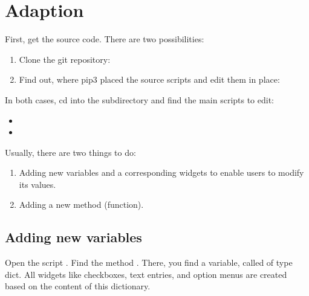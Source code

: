 \documentclass[letterpaper,10pt,english]{sphinxmanual}
\begin{document}
\section{Adaption}
\label{\detokenize{usage:adaption}}
First, get the source code. There are two possibilities:
\begin{enumerate}
%
\item {} 
Clone the git repository:

\begin{sphinxVerbatim}[commandchars=\\\{\}]
  
\end{sphinxVerbatim}

\item {} 
Find out, where pip3 placed the source scripts and edit them in place:

\begin{sphinxVerbatim}[commandchars=\\\{\}]
  
\end{sphinxVerbatim}

\end{enumerate}

In both cases, cd into the subdirectory  and find the main scripts to edit:
\begin{itemize}
\item {} 

\item {} 

\end{itemize}

Usually, there are two things to do:
\begin{enumerate}
%
\item {} 
Adding new variables and a corresponding widgets to enable users to modify its values.

\item {} 
Adding a new method (function).

\end{enumerate}


\subsection{Adding new variables}
\label{\detokenize{usage:adding-new-variables}}
Open the script . Find the method . There, you find a variable, called  of type dict. All widgets like checkboxes, text entries, and option menus are created based on the content of this dictionary.
\end{document}

